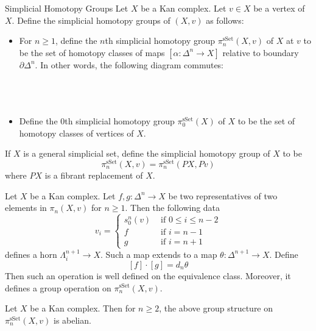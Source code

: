 \documentclass[a4paper]{article}
\begin{document}
\begin{defn}{Simplicial Homotopy Groups}{} Let $X$ be a Kan complex. Let $v\in X$ be a vertex of $X$. Define the simplicial homotopy groups of $(X,v)$ as follows: 
\begin{itemize}
\item For $n\geq 1$, define the $n$th simplicial homotopy group $\pi_n^\text{sSet}(X,v)$ of $X$ at $v$ to be the set of homotopy classes of maps $[\alpha:\Delta^n\to X]$ relative to boundary $\partial\Delta^n$. In other words, the following diagram commutes: \\~\\
\\~\\
\item Define the $0$th simplicial homotopy group $\pi_0^\text{sSet}(X)$ of $X$ to be the set of homotopy classes of vertices of $X$. 
\end{itemize}
If $X$ is a general simplicial set, define the simplicial homotopy group of $X$ to be $$\pi_n^\text{sSet}(X,v)=\pi_n^\text{sSet}(PX,Pv)$$ where $PX$ is a fibrant replacement of $X$. 
\end{defn}

\begin{thm}{}{} Let $X$ be a Kan complex. Let $f,g:\Delta^n\to X$ be two representatives of two elements in $\pi_n(X,v)$ for $n\geq 1$. Then the following data $$v_i=\begin{cases}
s_0^n(v) & \text{ if } 0\leq i\leq n-2\\
f & \text{ if } i=n-1\\
g & \text{ if } i=n+1
\end{cases}$$
defines a horn $\Lambda_i^{n+1}\to X$. Such a map extends to a map $\theta:\Delta^{n+1}\to X$. Define $$[f]\cdot[g]=d_n\theta$$ Then such an operation is well defined on the equivalence class. Moreover, it defines a group operation on $\pi_n^\text{sSet}(X,v)$. 
\end{thm}

\begin{thm}{}{} Let $X$ be a Kan complex. Then for $n\geq 2$, the above group structure on $\pi_n^\text{sSet}(X,v)$ is abelian. 
\end{thm}
\end{document}
